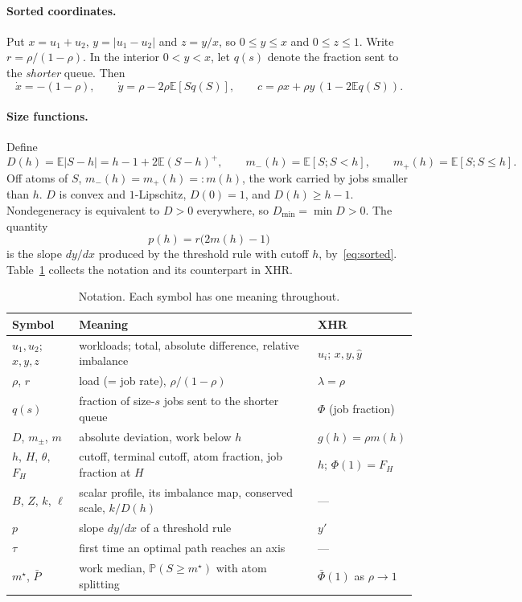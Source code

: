 \documentclass[11pt]{article}
\numberwithin{equation}{section}
\theoremstyle{definition}
\theoremstyle{remark}
\newcommand{\E}{\mathbb{E}}
\newcommand{\Prob}{\mathbb{P}}
\begin{document}
\paragraph{Sorted coordinates.} Put $x=u_1+u_2$, $y=|u_1-u_2|$ and $z=y/x$, so $0\le y\le x$ and $0\le z\le1$. Write $r=\rho/(1-\rho)$. In the interior $0<y<x$, let $q(s)$ denote the fraction sent to the \emph{shorter} queue. Then
\begin{equation}\label{eq:sorted}
\dot x=-(1-\rho),\qquad \dot y=\rho-2\rho\E[Sq(S)],\qquad c=\rho x+\rho y\,(1-2\E q(S)).
\end{equation}

\paragraph{Size functions.} Define
\begin{equation}\label{eq:D}
D(h)=\E|S-h|=h-1+2\E(S-h)^+,\qquad m_-(h)=\E[S;S<h],\qquad m_+(h)=\E[S;S\le h].
\end{equation}
Off atoms of $S$, $m_-(h)=m_+(h)=:m(h)$, the work carried by jobs smaller than $h$. $D$ is convex and $1$-Lipschitz, $D(0)=1$, and $D(h)\ge h-1$. Nondegeneracy is equivalent to $D>0$ everywhere, so $D_{\min}=\min D>0$. The quantity
\begin{equation}\label{eq:slope}
p(h)=r\bigl(2m(h)-1\bigr)
\end{equation}
is the slope $dy/dx$ produced by the threshold rule with cutoff $h$, by~\eqref{eq:sorted}. Table~\ref{tab:notation} collects the notation and its counterpart in XHR.

\begin{table}[h]
\centering\small
\caption{Notation. Each symbol has one meaning throughout.}\label{tab:notation}
\begin{tabular}{@{}lll@{}}
\toprule
Symbol & Meaning & XHR \\
\midrule
$u_1,u_2$; $x,y,z$ & workloads; total, absolute difference, relative imbalance & $u_i$; $x,y,\hat y$\\
$\rho$, $r$ & load (= job rate), $\rho/(1-\rho)$ & $\lambda=\rho$\\
$q(s)$ & fraction of size-$s$ jobs sent to the shorter queue & $\Phi$ (job fraction)\\
$D$, $m_\pm$, $m$ & absolute deviation, work below $h$ & $g(h)=\rho m(h)$\\
$h$, $H$, $\theta$, $F_H$ & cutoff, terminal cutoff, atom fraction, job fraction at $H$ & $h$; $\Phi(1)=F_H$\\
$B$, $Z$, $k$, $\ell$ & scalar profile, its imbalance map, conserved scale, $k/D(h)$ & ---\\
$p$ & slope $dy/dx$ of a threshold rule & $y'$\\
$\tau$ & first time an optimal path reaches an axis & ---\\
$m^\star$, $\bar P$ & work median, $\Prob(S\ge m^\star)$ with atom splitting & $\bar\Phi(1)$ as $\rho\to1$\\
\bottomrule
\end{tabular}
\end{table}
\end{document}
